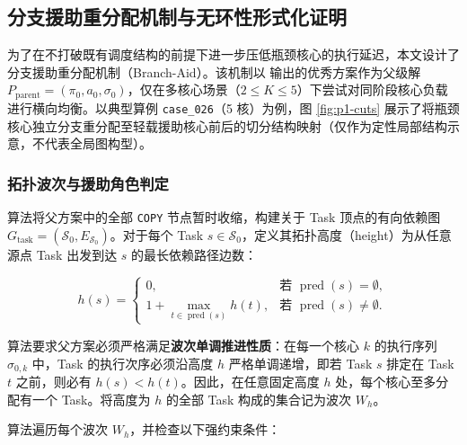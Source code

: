 \documentclass[anonymous,withtoc]{gmcm2026}
\begin{document}
\subsection{分支援助重分配机制与无环性形式化证明}

为了在不打破既有调度结构的前提下进一步压低瓶颈核心的执行延迟，本文设计了分支援助重分配机制（Branch-Aid）。该机制以 \texttt{} 输出的优秀方案作为父级解 \(P_{\mathrm{parent}} = (\pi_0, a_0, \sigma_0)\)，仅在多核心场景（\(2 \le K \le 5\)）下尝试对同阶段核心负载进行横向均衡。以典型算例 \texttt{case\_026}（5 核）为例，图 \ref{fig:p1-cuts} 展示了将瓶颈核心独立分支重分配至轻载援助核心前后的切分结构映射（仅作为定性局部结构示意，不代表全局图构型）。

\subsubsection{拓扑波次与援助角色判定}

算法将父方案中的全部 \texttt{COPY} 节点暂时收缩，构建关于 Task 顶点的有向依赖图 \(G_{\mathrm{task}} = (\mathcal{S}_0, E_{\mathcal{S}_0})\)。对于每个 Task \(s \in \mathcal{S}_0\)，定义其拓扑高度（height）为从任意源点 Task 出发到达 \(s\) 的最长依赖路径边数：

\begin{equation}
h(s) = \begin{cases} 0, & \text{若 } \operatorname{pred}(s) = \emptyset, \\ 1 + \max_{t \in \operatorname{pred}(s)} h(t), & \text{若 } \operatorname{pred}(s) \ne \emptyset. \end{cases}
\end{equation}

算法要求父方案必须严格满足\textbf{波次单调推进性质}：在每一个核心 \(k\) 的执行序列 \(\sigma_{0,k}\) 中，Task 的执行次序必须沿高度 \(h\) 严格单调递增，即若 Task \(s\) 排定在 Task \(t\) 之前，则必有 \(h(s) < h(t)\)。因此，在任意固定高度 \(h\) 处，每个核心至多分配有一个 Task。将高度为 \(h\) 的全部 Task 构成的集合记为波次 \(W_h\)。

算法遍历每个波次 \(W_h\)，并检查以下强约束条件：
\end{document}
